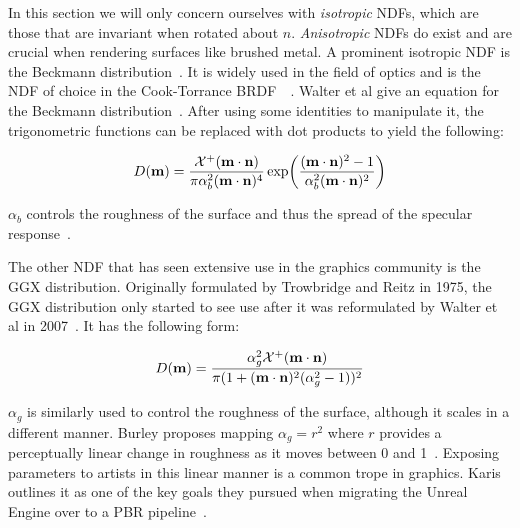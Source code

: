 In this section we will only concern ourselves with \textit{isotropic} NDFs, which are those that are invariant when rotated about \begin{math}n\end{math}. \textit{Anisotropic} NDFs do exist and are crucial when rendering surfaces like brushed metal. A prominent isotropic NDF is the Beckmann distribution~\cite{Beckmann}. It is widely used in the field of optics and is the NDF of choice in the Cook-Torrance BRDF~\cite{WalterRefraction}~\cite{CookTorrance}. Walter et al give an equation for the Beckmann distribution~\cite{WalterRefraction}. After using some identities to manipulate it, the trigonometric functions can be replaced with dot products to yield the following:

\begin{equation}
	D(\mathbf{m}) = \frac{\mathcal{X}^+(\mathbf{m}\cdot\mathbf{n})}{\pi\alpha_b^2(\mathbf{m}\cdot\mathbf{n})^4}\exp(\frac{(\mathbf{m}\cdot\mathbf{n})^2 - 1}{\alpha_b^2(\mathbf{m}\cdot\mathbf{n})^2})
\end{equation}

\begin{math}\alpha_b\end{math} controls the roughness of the surface and thus the spread of the specular response~\cite{CookTorrance}.

The other NDF that has seen extensive use in the graphics community is the GGX distribution. Originally formulated by Trowbridge and Reitz in 1975, the GGX distribution only started to see use after it was reformulated by Walter et al in 2007~\cite{TrowbridgeAndReitz}\cite{WalterRefraction}. It has the following form:

\begin{equation} \label{eq:GGX}
	D(\mathbf{m}) = \frac{\alpha_g^2\mathcal{X}^+(\mathbf{m}\cdot\mathbf{n})}{\pi(1 + (\mathbf{m}\cdot\mathbf{n})^2(\alpha_g^2 - 1))^2}
\end{equation}

\begin{math}\alpha_g\end{math} is similarly used to control the roughness of the surface, although it scales in a different manner. Burley proposes mapping \begin{math}\alpha_g = r^2\end{math} where \begin{math}r\end{math} provides a perceptually linear change in roughness as it moves between 0 and 1~\cite{Burley2012Physically}. Exposing parameters to artists in this linear manner is a common trope in graphics. Karis outlines it as one of the key goals they pursued when migrating the Unreal Engine over to a PBR pipeline~\cite{RealShadingInUnreal}.

